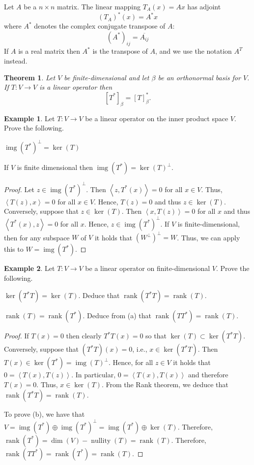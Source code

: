 \documentclass[12pt]{article}
\DeclareMathOperator{\rank}{rank}
\DeclareMathOperator{\rng}{img}
\DeclareMathOperator{\nullity}{nullity}
\newcommand{\tv}{T:V\rightarrow V}
\newcommand{\indot}[1]{\left\langle #1 \right\rangle}
\newtheorem{theorem}{Theorem}[section]
\theoremstyle{definition}
\newtheorem{example}{Example}[section]
\begin{document}
Let $A$ be a $n\times n$ matrix.  The linear mapping $T_A(x) = Ax$ has adjoint
\[
(T_A)^*(x) = A^*x
\]
where $A^*$ denotes the complex conjugate transpose of $A$:
\[
(A^*)_{ij} = \overline{A_{ij}}
\]
If $A$ is a real matrix then $A^*$ is the transpose of $A$, and we use the notation $A^T$ instead.

\begin{theorem}
Let $V$ be finite-dimensional and let $\beta$ be an orthonormal basis for $V$.  If $\tv$ is a linear operator then
\[
[T^*]_\beta = [T]_\beta^*.
\]
\end{theorem}

\begin{example}
Let $\tv$ be a linear operator on the inner product space $V$.  Prove the following.
\begin{compactenum}[(a)]
\item $\rng(T^*)^\perp = \ker(T)$
\item If $V$ is finite dimensional then $\rng(T^*)=\ker(T)^\perp$.
\end{compactenum}
\begin{proof}
Let $z\in \rng(T^*)^\perp$.  Then $\indot{z,T^*(x)}=0$ for all $x\in V$.  Thus, $\indot{T(z),x}=0$ for all $x\in V$.  Hence, $T(z)=0$ and thus $z\in\ker(T)$.  Conversely, suppose that $z\in\ker(T)$.  Then $\indot{x,T(z)}=0$ for all $x$ and thus $\indot{T^*(x),z}=0$ for all $x$.  Hence, $z\in\rng(T^*)^\perp$.  If $V$ is finite-dimensional, then for any subspace $W$ of $V$ it holds that $(W^\perp)^\perp = W$.  Thus, we can apply this to $W=\rng(T^*)$.
\end{proof}

\end{example}

\begin{example}
Let $\tv$ be a linear operator on finite-dimensional $V$.  Prove the following.
\begin{compactenum}[(a)]
\item $\ker(T^*T)=\ker(T)$.  Deduce that $\rank(T^*T)=\rank(T)$.
\item $\rank(T)=\rank(T^*)$.  Deduce from (a) that $\rank(TT^*)=\rank(T)$.
\end{compactenum}
\begin{proof}
If $T(x)=0$ then clearly $T^*T(x)=0$ so that $\ker(T)\subset\ker(T^*T)$.  Conversely, suppose that $(T^*T)(x)=0$, i.e., $x\in\ker(T^*T)$.  Then $T(x)\in \ker(T^*) = \rng(T)^\perp$.  Hence, for all $z\in V$ it holds that $0= \indot{T(x),T(z)}$.  In particular, $0=\indot{T(x),T(x)}$ and therefore $T(x)=0$.  Thus, $x\in\ker(T)$.  From the Rank theorem, we deduce that $\rank(T^*T)=\rank(T)$.

To prove (b), we have that $V = \rng(T^*)\oplus \rng(T^*)^\perp = \rng(T^*) \oplus \ker(T)$.  Therefore, $\rank(T^*)=\dim(V)-\nullity(T) = \rank(T)$.  Therefore, $\rank(TT^*)=\rank(T^*)=\rank(T)$.
\end{proof}
\end{example}
\end{document}

